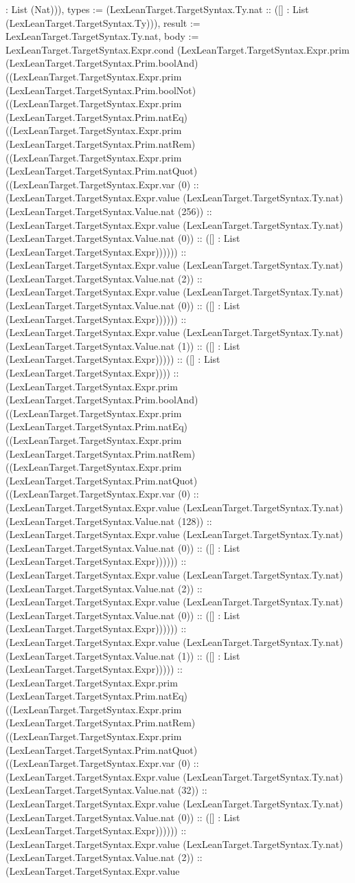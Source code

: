 \documentclass[11pt]{article}
\begin{document}
: List (Nat))), types := (LexLeanTarget.TargetSyntax.Ty.nat :: ([] : List (LexLeanTarget.TargetSyntax.Ty))), result := LexLeanTarget.TargetSyntax.Ty.nat, body := LexLeanTarget.TargetSyntax.Expr.cond (LexLeanTarget.TargetSyntax.Expr.prim (LexLeanTarget.TargetSyntax.Prim.boolAnd) ((LexLeanTarget.TargetSyntax.Expr.prim (LexLeanTarget.TargetSyntax.Prim.boolNot) ((LexLeanTarget.TargetSyntax.Expr.prim (LexLeanTarget.TargetSyntax.Prim.natEq) ((LexLeanTarget.TargetSyntax.Expr.prim (LexLeanTarget.TargetSyntax.Prim.natRem) ((LexLeanTarget.TargetSyntax.Expr.prim (LexLeanTarget.TargetSyntax.Prim.natQuot) ((LexLeanTarget.TargetSyntax.Expr.var (0) :: (LexLeanTarget.TargetSyntax.Expr.value (LexLeanTarget.TargetSyntax.Ty.nat) (LexLeanTarget.TargetSyntax.Value.nat (256)) :: (LexLeanTarget.TargetSyntax.Expr.value (LexLeanTarget.TargetSyntax.Ty.nat) (LexLeanTarget.TargetSyntax.Value.nat (0)) :: ([] : List (LexLeanTarget.TargetSyntax.Expr)))))) :: (LexLeanTarget.TargetSyntax.Expr.value (LexLeanTarget.TargetSyntax.Ty.nat) (LexLeanTarget.TargetSyntax.Value.nat (2)) :: (LexLeanTarget.TargetSyntax.Expr.value (LexLeanTarget.TargetSyntax.Ty.nat) (LexLeanTarget.TargetSyntax.Value.nat (0)) :: ([] : List (LexLeanTarget.TargetSyntax.Expr)))))) :: (LexLeanTarget.TargetSyntax.Expr.value (LexLeanTarget.TargetSyntax.Ty.nat) (LexLeanTarget.TargetSyntax.Value.nat (1)) :: ([] : List (LexLeanTarget.TargetSyntax.Expr))))) :: ([] : List (LexLeanTarget.TargetSyntax.Expr)))) :: (LexLeanTarget.TargetSyntax.Expr.prim (LexLeanTarget.TargetSyntax.Prim.boolAnd) ((LexLeanTarget.TargetSyntax.Expr.prim (LexLeanTarget.TargetSyntax.Prim.natEq) ((LexLeanTarget.TargetSyntax.Expr.prim (LexLeanTarget.TargetSyntax.Prim.natRem) ((LexLeanTarget.TargetSyntax.Expr.prim (LexLeanTarget.TargetSyntax.Prim.natQuot) ((LexLeanTarget.TargetSyntax.Expr.var (0) :: (LexLeanTarget.TargetSyntax.Expr.value (LexLeanTarget.TargetSyntax.Ty.nat) (LexLeanTarget.TargetSyntax.Value.nat (128)) :: (LexLeanTarget.TargetSyntax.Expr.value (LexLeanTarget.TargetSyntax.Ty.nat) (LexLeanTarget.TargetSyntax.Value.nat (0)) :: ([] : List (LexLeanTarget.TargetSyntax.Expr)))))) :: (LexLeanTarget.TargetSyntax.Expr.value (LexLeanTarget.TargetSyntax.Ty.nat) (LexLeanTarget.TargetSyntax.Value.nat (2)) :: (LexLeanTarget.TargetSyntax.Expr.value (LexLeanTarget.TargetSyntax.Ty.nat) (LexLeanTarget.TargetSyntax.Value.nat (0)) :: ([] : List (LexLeanTarget.TargetSyntax.Expr)))))) :: (LexLeanTarget.TargetSyntax.Expr.value (LexLeanTarget.TargetSyntax.Ty.nat) (LexLeanTarget.TargetSyntax.Value.nat (1)) :: ([] : List (LexLeanTarget.TargetSyntax.Expr))))) :: (LexLeanTarget.TargetSyntax.Expr.prim (LexLeanTarget.TargetSyntax.Prim.natEq) ((LexLeanTarget.TargetSyntax.Expr.prim (LexLeanTarget.TargetSyntax.Prim.natRem) ((LexLeanTarget.TargetSyntax.Expr.prim (LexLeanTarget.TargetSyntax.Prim.natQuot) ((LexLeanTarget.TargetSyntax.Expr.var (0) :: (LexLeanTarget.TargetSyntax.Expr.value (LexLeanTarget.TargetSyntax.Ty.nat) (LexLeanTarget.TargetSyntax.Value.nat (32)) :: (LexLeanTarget.TargetSyntax.Expr.value (LexLeanTarget.TargetSyntax.Ty.nat) (LexLeanTarget.TargetSyntax.Value.nat (0)) :: ([] : List (LexLeanTarget.TargetSyntax.Expr)))))) :: (LexLeanTarget.TargetSyntax.Expr.value (LexLeanTarget.TargetSyntax.Ty.nat) (LexLeanTarget.TargetSyntax.Value.nat (2)) :: (LexLeanTarget.TargetSyntax.Expr.value 
\end{document}
